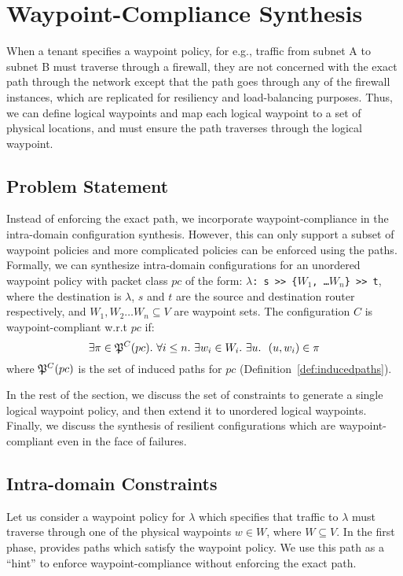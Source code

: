 \section{Waypoint-Compliance Synthesis}
When a tenant specifies a waypoint policy, for e.g., traffic from
subnet A to subnet B must traverse through a firewall, they are not
concerned with the exact path through the network except that the 
path goes through any of the firewall instances, which are replicated 
for resiliency and load-balancing purposes. Thus, we can define 
logical waypoints and map each logical waypoint to a set of physical
locations, and \name must ensure the path traverses through the logical waypoint.

\subsection{Problem Statement}
Instead of enforcing the
exact \genesis path, we incorporate waypoint-compliance in the 
intra-domain configuration synthesis. However, this can only 
support a subset of waypoint policies and more complicated policies
can be enforced using the \genesis paths. 
Formally, we can synthesize intra-domain configurations
for an unordered waypoint policy with packet class $pc$ of the form: 
\texttt{$\lambda$: s >> \{$W_1$, \ldots $W_n$\} >> t},
where the destination is $\lambda$,  
$s$ and $t$ are the source and destination router respectively, 
and $W_1, W_2 \ldots W_n \subseteq V$ are waypoint sets.
The configuration $C$ is waypoint-compliant w.r.t $pc$ if: 
\[
\exists \pi \in \mathfrak{P}^C(pc). ~\forall i \leq n. ~\exists w_i \in W_i. 
~\exists u. ~~(u, w_i) \in \pi 
\]
where $\mathfrak{P}^C(pc)$ is the set of induced paths for 
$pc$ (Definition~\ref{def:inducedpaths}). 

In the rest of the section, we discuss the set of constraints
to generate a single logical waypoint policy, and then extend it 
to unordered logical waypoints. Finally, we discuss the synthesis
of resilient configurations which are waypoint-compliant even in 
the face of failures. 

\subsection{Intra-domain Constraints}
Let us consider a waypoint policy for $\lambda$ which
specifies that traffic to $\lambda$ must traverse through
one of the physical waypoints $w \in W$, where $W \subseteq V$.
In the first phase, \genesis provides paths which
satisfy the waypoint policy. We use this path as a 
``hint'' to enforce waypoint-compliance without 
enforcing the exact path. 

